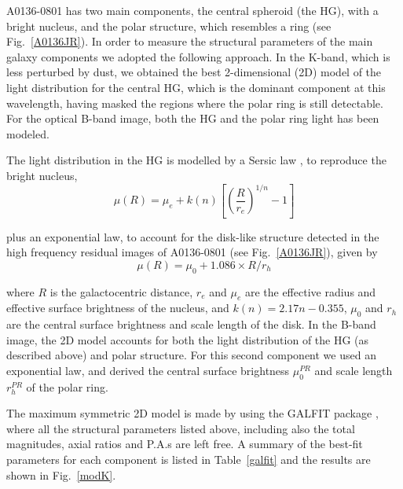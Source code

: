 \documentclass[useAMS,usenatbib]{mn2e}
\begin{document}
A0136-0801 has two main components, the central spheroid (the HG),
with a bright nucleus, and the polar structure, which resembles a ring
(see Fig.~\ref{A0136JR}).  In order to measure the structural
parameters of the main galaxy components we adopted the following
approach. In the K-band, which is less perturbed by dust, we obtained
the best 2-dimensional (2D) model of the light distribution for the
central HG, which is the dominant component at this wavelength, having
masked the regions where the polar ring is still detectable. For the
optical B-band image, both the HG and the polar ring light has been
modeled.

The light distribution in the HG is modelled by a Sersic law \citep{Ser68}, to reproduce the bright nucleus,
\begin{equation}
\label{sersic}
\mu (R) = \mu_e + k(n) \left[ \left( \frac{R}{r_e}\right)^{1/n} -1\right]
\end{equation}

plus an exponential law, to account for the disk-like structure detected in the high frequency residual images of A0136-0801 (see Fig.~\ref{A0136JR}), given by 
\begin{equation}
\mu(R)= \mu_{0} + 1.086 \times R/r_{h}
\end{equation}

where $R$ is the galactocentric distance, $r_e$ and $\mu_e$ are the
effective radius and effective surface brightness of the nucleus, and
$k(n)=2.17 n - 0.355$, $\mu_{0}$ and $r_{h}$ are the central surface
brightness and scale length of the disk.  In the B-band image, the 2D
model accounts for both the light distribution of the HG (as
described above) and polar structure. For this second component
we used an exponential law, and derived the central surface brightness
$\mu^{PR}_{0}$ and scale length $r^{PR}_{h}$ of the polar ring.

The maximum symmetric 2D model is made by using the GALFIT package
\citep{Peng02}, where all the structural parameters listed above,
including also the total magnitudes, axial ratios and P.A.s are left
free. A summary of the best-fit parameters for each component is
listed in Table~\ref{galfit} and the results are shown in
Fig.~\ref{modK}.
\end{document}
